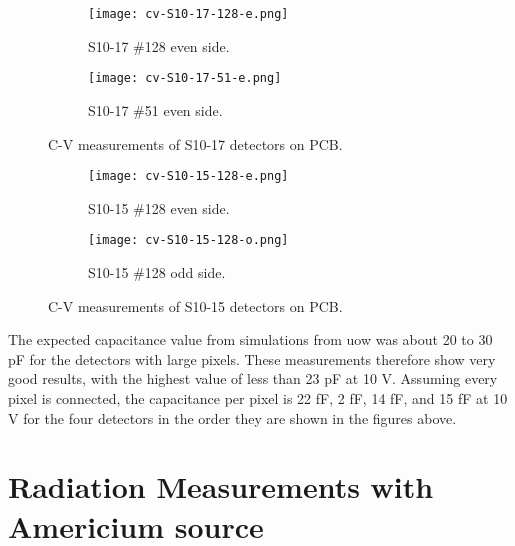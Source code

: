 \documentclass[../main/thesis.tex]{subfiles}
\begin{document}
\begin{figure}
	\centering
	\begin{subfigure}{.5\textwidth}
		\centering
		\texttt{[image: cv-S10-17-128-e.png]}
		\caption{S10-17 \#128 even side.}
		\label{fig-cv-S10-17-128-e}
	\end{subfigure}%
	\begin{subfigure}{.5\textwidth}
		\centering
		\texttt{[image: cv-S10-17-51-e.png]}
		\caption{S10-17 \#51 even side.}
		\label{fig-cv-S10-17-51-e} 
	\end{subfigure}
	\caption{C-V measurements of S10-17 detectors on PCB.}
	\label{fig-3d-cv-S10-17}
\end{figure}

\begin{figure}
	\centering
	\begin{subfigure}{.5\textwidth}
		\centering
		\texttt{[image: cv-S10-15-128-e.png]}
		\caption{S10-15 \#128 even side.}
		\label{fig-cv-S10-15-128-e}
	\end{subfigure}%
	\begin{subfigure}{.5\textwidth}
		\centering
		\texttt{[image: cv-S10-15-128-o.png]}
		\caption{S10-15 \#128 odd side.}
		\label{fig-cv-S10-15-128-o}
	\end{subfigure}
	\caption{C-V measurements of S10-15 detectors on PCB.}
	\label{fig-3d-cv-S10-15}
\end{figure}

The expected capacitance value from simulations from \gls{uow} was about 20 to 30 pF for the detectors with large pixels. These measurements therefore show very good results, with the highest value of less than 23 pF at 10 V. Assuming every pixel is connected, the capacitance per pixel is 22 fF, 2 fF, 14 fF, and 15 fF at 10 V for the four detectors in the order they are shown in the figures above. 

\section{Radiation Measurements with Americium source}
\end{document}
